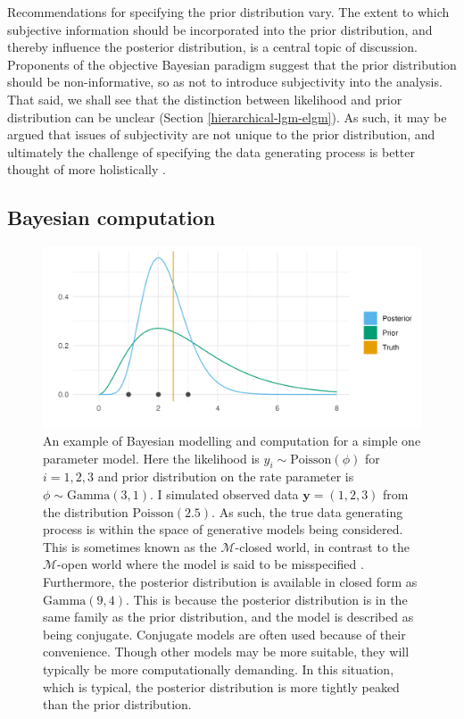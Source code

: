 \documentclass[a4paper, nobind]{templates/ociamthesis}
\begin{document}
Recommendations for specifying the prior distribution vary.
The extent to which subjective information should be incorporated into the prior distribution, and thereby influence the posterior distribution, is a central topic of discussion.
Proponents of the objective Bayesian paradigm suggest that the prior distribution should be non-informative, so as not to introduce subjectivity into the analysis.
That said, we shall see that the distinction between likelihood and prior distribution can be unclear (Section \ref{hierarchical-lgm-elgm}).
As such, it may be argued that issues of subjectivity are not unique to the prior distribution, and ultimately the challenge of specifying the data generating process is better thought of more holistically \autocite{gelman2017prior}.

\hypertarget{bayesian-computation}{%
\subsection{Bayesian computation}\label{bayesian-computation}}



\begin{figure}

{\centering \includegraphics[width=0.95\linewidth]{figures/bayesian/conjugate} 

}

\caption{An example of Bayesian modelling and computation for a simple one parameter model. Here the likelihood is \(y_i \sim \text{Poisson}(\phi)\) for \(i = 1, 2, 3\) and prior distribution on the rate parameter is \(\phi \sim \text{Gamma}(3, 1)\). I simulated observed data \(\mathbf{y} = (1, 2, 3)\) from the distribution \(\text{Poisson}(2.5)\). As such, the true data generating process is within the space of generative models being considered. This is sometimes known as the \(\mathcal{M}\)-closed world, in contrast to the \(\mathcal{M}\)-open world where the model is said to be misspecified \autocite{bernardo2001bayesian}. Furthermore, the posterior distribution is available in closed form as \(\text{Gamma}(9, 4)\). This is because the posterior distribution is in the same family as the prior distribution, and the model is described as being conjugate. Conjugate models are often used because of their convenience. Though other models may be more suitable, they will typically be more computationally demanding. In this situation, which is typical, the posterior distribution is more tightly peaked than the prior distribution.}\label{fig:conjugate}
\end{figure}
\end{document}
